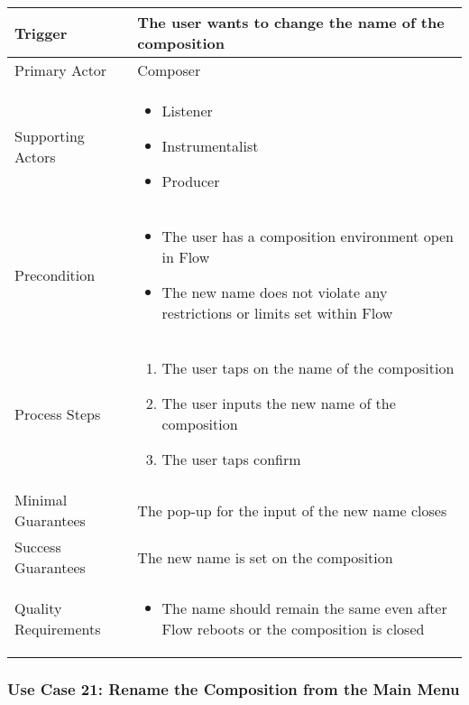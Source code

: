 \begin{tabularx}{\textwidth}{|X|X|}
\hline
Trigger & 
The user wants to change the name of the composition \\
\hline
Primary Actor & 
Composer \\
\hline
Supporting Actors & 
\begin{itemize}
\item Listener
\item Instrumentalist
\item Producer
\end{itemize} \\
\hline
Precondition & 
\begin{itemize}
\item The user has a composition environment open in Flow
\item The new name does not violate any restrictions or limits set within Flow
\end{itemize} \\
\hline
Process Steps & 
\begin{enumerate}
\item The user taps on the name of the composition
\item The user inputs the new name of the composition
\item The user taps confirm
\end{enumerate} \\
\hline
Minimal Guarantees & 
The pop-up for the input of the new name closes \\
\hline
Success Guarantees & 
The new name is set on the composition \\
\hline
Quality Requirements & 
\begin{itemize}
\item The name should remain the same even after Flow reboots or the composition is closed
\end{itemize} \\ 
\hline
\end{tabularx}

\subsubsection{Use Case 21: Rename the Composition from the Main Menu}


